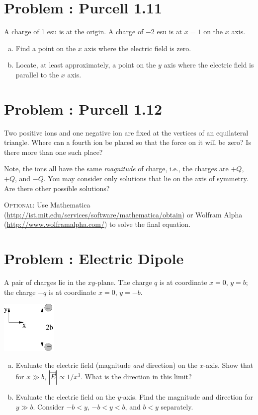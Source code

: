 \documentclass[problems]{esg8022pset}
\begin{document}
\section{Problem \thesection: Purcell 1.11}
  A charge of 1 esu is at the origin. A charge of $-2$ esu is at $x = 1$ on the $x$ axis.
  \begin{enumerate}[(a)]
    \item Find a point on the $x$ axis where the electric field is zero.
    \item Locate, at least approximately, a point on the $y$ axis where the electric field is parallel to the $x$ axis.
  \end{enumerate}
\section{Problem \thesection: Purcell 1.12}
  Two positive ions and one negative ion are fixed at the vertices of an equilateral triangle.  Where can a fourth ion be placed so that the force on it will be zero?  Is there more than one such place?

  Note, the ions all have the same \emph{magnitude} of charge, i.e., the charges are $+Q$, $+Q$, and $-Q$. You may consider only solutions that lie on the axis of symmetry. Are there other possible solutions?

  \textsc{Optional}: Use Mathematica (\url{http://ist.mit.edu/services/software/mathematica/obtain}) or Wolfram Alpha (\url{http://www.wolframalpha.com/}) to solve the final equation.
\section{Problem \thesection: Electric Dipole}
  A pair of charges lie in the $xy$-plane.  The charge $q$ is at coordinate $x = 0$, $y = b$; the charge $-q$ is at coordinate $x = 0$, $y = -b$.
  \begin{center}\includegraphics[width=0.2\textwidth]{ps01_8}\end{center}
  \begin{enumerate}[(a)]
    \item Evaluate the electric field (magnitude \emph{and} direction) on the $x$-axis.  Show that for $x \gg b$, $|\vec E| \propto 1 / x^3$.  What is the direction in this limit?
    \item Evaluate the electric field on the $y$-axis.  Find the magnitude and direction for $y \gg b$.  Consider $-b < y$, $-b < y < b$, and $b < y$ separately.
  \end{enumerate}
\end{document}
